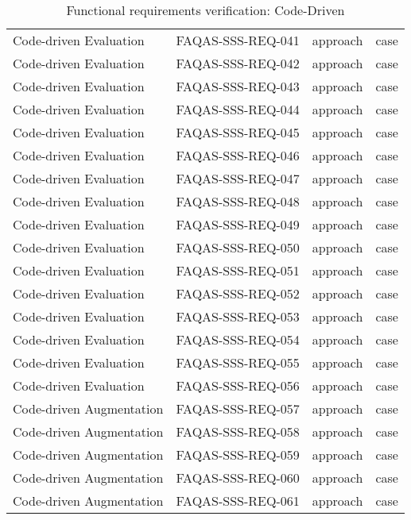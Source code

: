 \begin{table}[H]
{\begin{tabular}{|l|l|l|l|}
Code-driven Evaluation & FAQAS-SSS-REQ-041 & approach & case \\
Code-driven Evaluation & FAQAS-SSS-REQ-042 & approach & case \\
Code-driven Evaluation & FAQAS-SSS-REQ-043 & approach & case \\
Code-driven Evaluation & FAQAS-SSS-REQ-044 & approach & case \\
Code-driven Evaluation & FAQAS-SSS-REQ-045 & approach & case \\
Code-driven Evaluation & FAQAS-SSS-REQ-046 & approach & case \\
Code-driven Evaluation & FAQAS-SSS-REQ-047 & approach & case \\
Code-driven Evaluation & FAQAS-SSS-REQ-048 & approach & case \\
Code-driven Evaluation & FAQAS-SSS-REQ-049 & approach & case \\
Code-driven Evaluation & FAQAS-SSS-REQ-050 & approach & case \\
Code-driven Evaluation & FAQAS-SSS-REQ-051 & approach & case \\
Code-driven Evaluation & FAQAS-SSS-REQ-052 & approach & case \\
Code-driven Evaluation & FAQAS-SSS-REQ-053 & approach & case \\
Code-driven Evaluation & FAQAS-SSS-REQ-054 & approach & case \\
Code-driven Evaluation & FAQAS-SSS-REQ-055 & approach & case \\
Code-driven Evaluation & FAQAS-SSS-REQ-056 & approach & case \\
Code-driven Augmentation & FAQAS-SSS-REQ-057 & approach & case \\
Code-driven Augmentation & FAQAS-SSS-REQ-058 & approach & case \\
Code-driven Augmentation & FAQAS-SSS-REQ-059 & approach & case \\
Code-driven Augmentation & FAQAS-SSS-REQ-060 & approach & case \\
Code-driven Augmentation & FAQAS-SSS-REQ-061 & approach & case \\
\hline
\end{tabular}
  }
  \caption{Functional requirements verification: Code-Driven}
  \label{tables:code}
\end{table}
